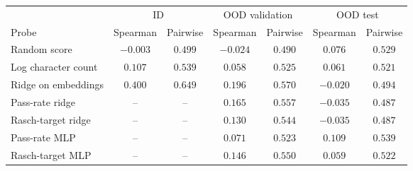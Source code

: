 \begin{tabular}{lcccccc}
\toprule
 & \multicolumn{2}{c}{ID} & \multicolumn{2}{c}{OOD validation} & \multicolumn{2}{c}{OOD test}\\
\cmidrule(lr){2-3}\cmidrule(lr){4-5}\cmidrule(lr){6-7}
Probe & Spearman & Pairwise & Spearman & Pairwise & Spearman & Pairwise\\
\midrule
Random score & $-0.003$ & $0.499$ & $-0.024$ & $0.490$ & $0.076$ & $0.529$ \\
Log character count & $0.107$ & $0.539$ & $0.058$ & $0.525$ & $0.061$ & $0.521$ \\
Ridge on embeddings & $0.400$ & $0.649$ & $0.196$ & $0.570$ & $-0.020$ & $0.494$ \\
Pass-rate ridge & -- & -- & $0.165$ & $0.557$ & $-0.035$ & $0.487$ \\
Rasch-target ridge & -- & -- & $0.130$ & $0.544$ & $-0.035$ & $0.487$ \\
Pass-rate MLP & -- & -- & $0.071$ & $0.523$ & $0.109$ & $0.539$ \\
Rasch-target MLP & -- & -- & $0.146$ & $0.550$ & $0.059$ & $0.522$ \\
\bottomrule
\end{tabular}
